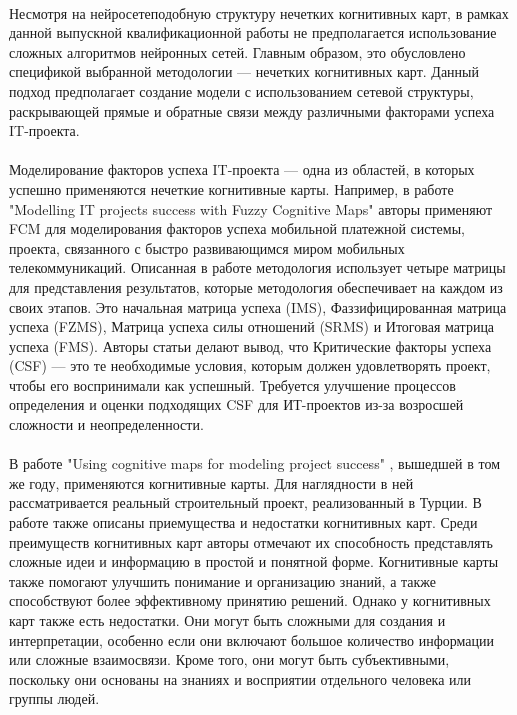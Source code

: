 \documentclass{article}
\begin{document}
    ~\\
    Несмотря на нейросетеподобную структуру нечетких когнитивных карт, в рамках данной выпускной квалификационной работы не предполагается использование сложных алгоритмов нейронных сетей. Главным образом, это обусловлено спецификой выбранной методологии — нечетких когнитивных карт. Данный подход предполагает создание модели с использованием сетевой структуры, раскрывающей прямые и обратные связи между различными факторами успеха IT-проекта.\\
    ~\\
    Моделирование факторов успеха IT-проекта — одна из областей, в которых успешно применяются нечеткие когнитивные карты. Например, в работе "{}Modelling IT projects success with Fuzzy Cognitive Maps"{} \cite{litlink18} авторы применяют FCM для моделирования факторов успеха мобильной платежной системы, проекта, связанного с быстро развивающимся миром мобильных телекоммуникаций. Описанная в работе методология использует четыре матрицы для представления результатов, которые методология обеспечивает на каждом из своих этапов. Это начальная матрица успеха (IMS), Фаззифицированная матрица успеха (FZMS), Матрица успеха силы отношений (SRMS) и Итоговая матрица успеха (FMS). Авторы статьи делают вывод, что Критические факторы успеха (CSF) — это те необходимые условия, которым должен удовлетворять проект, чтобы его воспринимали как успешный. Требуется улучшение процессов определения и оценки подходящих CSF для ИТ-проектов из-за возросшей сложности и неопределенности.\\
    ~\\
    В работе "{}Using cognitive maps for modeling project success"{} \cite{litlink19}, вышедшей в том же году, применяются когнитивные карты. Для наглядности в ней рассматривается реальный строительный проект, реализованный в Турции. В работе также описаны приемущества и недостатки когнитивных карт. Среди преимуществ когнитивных карт авторы отмечают их способность представлять сложные идеи и информацию в простой и понятной форме. Когнитивные карты также помогают улучшить понимание и организацию знаний, а также способствуют более эффективному принятию решений. Однако у когнитивных карт также есть недостатки. Они могут быть сложными для создания и интерпретации, особенно если они включают большое количество информации или сложные взаимосвязи. Кроме того, они могут быть субъективными, поскольку они основаны на знаниях и восприятии отдельного человека или группы людей.\\
    ~\\
\end{document}
